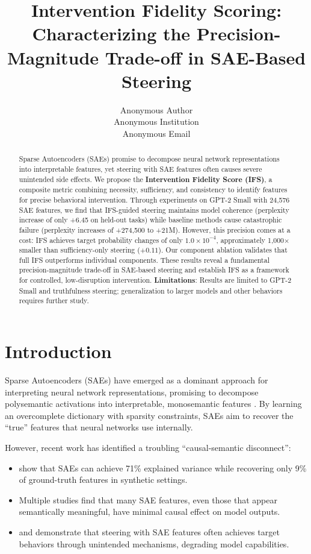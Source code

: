 \documentclass{article}
\title{Intervention Fidelity Scoring: Characterizing the Precision-Magnitude Trade-off in SAE-Based Steering}
\author{Anonymous Author\\
Anonymous Institution\\
Anonymous Email}
\begin{document}
\maketitle

\begin{abstract}
Sparse Autoencoders (SAEs) promise to decompose neural network representations into interpretable features, yet steering with SAE features often causes severe unintended side effects. We propose the \textbf{Intervention Fidelity Score (IFS)}, a composite metric combining necessity, sufficiency, and consistency to identify features for precise behavioral intervention. Through experiments on GPT-2 Small with 24,576 SAE features, we find that IFS-guided steering maintains model coherence (perplexity increase of only +6.45 on held-out tasks) while baseline methods cause catastrophic failure (perplexity increases of +274,500 to +21M). However, this precision comes at a cost: IFS achieves target probability changes of only $1.0 \times 10^{-4}$, approximately 1,000$\times$ smaller than sufficiency-only steering ($+0.11$). Our component ablation validates that full IFS outperforms individual components. These results reveal a fundamental precision-magnitude trade-off in SAE-based steering and establish IFS as a framework for controlled, low-disruption intervention. \textbf{Limitations}: Results are limited to GPT-2 Small and truthfulness steering; generalization to larger models and other behaviors requires further study.
\end{abstract}

\section{Introduction}
\label{sec:introduction}

Sparse Autoencoders (SAEs) have emerged as a dominant approach for interpreting neural network representations, promising to decompose polysemantic activations into interpretable, monosemantic features \citep{bricken2023towards, cunningham2023sparse}. By learning an overcomplete dictionary with sparsity constraints, SAEs aim to recover the ``true'' features that neural networks use internally.

However, recent work has identified a troubling ``causal-semantic disconnect'':
\begin{itemize}
    \item \citet{he2025sanity} show that SAEs can achieve 71\% explained variance while recovering only 9\% of ground-truth features in synthetic settings.
    \item Multiple studies \citep{chaudhary2024evidence, minegishi2025rethinking} find that many SAE features, even those that appear semantically meaningful, have minimal causal effect on model outputs.
    \item \citet{raedler2025unintended} and \citet{templeton2024scaling} demonstrate that steering with SAE features often achieves target behaviors through unintended mechanisms, degrading model capabilities.
\end{itemize}
\end{document}
